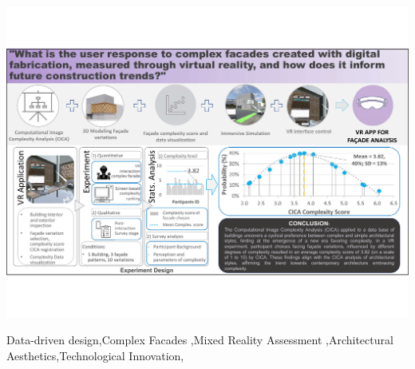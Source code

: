 \documentclass[final,5p,times]{elsarticle}%
\begin{document}
\begin{frontmatter}
\begin{graphicalabstract}
    \centering
    \includegraphics[width= \textwidth, trim = 0 80 0 80, clip]{Images/GraphicAbstract}
    \label{fig:graphic_abstract}
\end{graphicalabstract}

\begin{highlights}

\end{highlights}

\begin{keyword}
Data-driven design\sep Complex Facades \sep Mixed Reality Assessment \sep Architectural Aesthetics\sep Technological Innovation\sep

\end{keyword}

\end{frontmatter}
%
\end{document}
